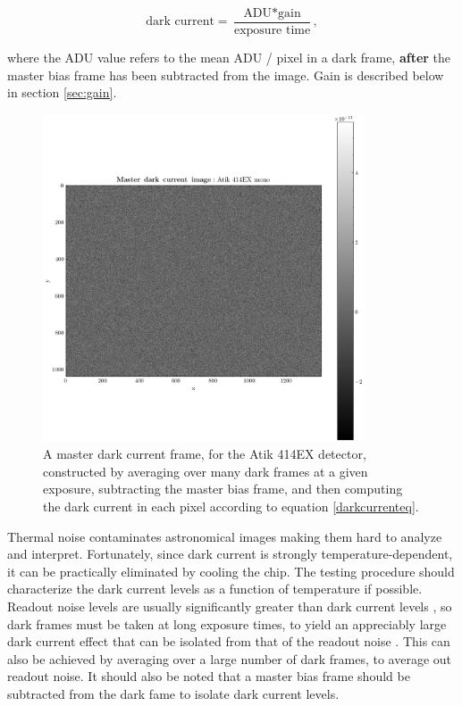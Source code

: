 \documentclass[../main.tex]{subfiles}
\begin{document}
	\begin{equation}\label{darkcurrenteq}
		\text{dark current} = \frac{\text{ADU} * \text{gain}}{\text{exposure time}},
	\end{equation}
	
	where the ADU value refers to the mean ADU / pixel in a dark frame, \textbf{after} the master bias frame has been subtracted from the image. Gain is described below in section \ref{sec:gain}.  
	\begin{figure}[h!]
		\centering
		\includegraphics[width	=0.85\textwidth]{master_dark.png}
		\caption{A master dark current frame, for the Atik 414EX detector, constructed by averaging over many dark frames at a given exposure, subtracting the master bias frame, and then computing the dark current in each pixel according to equation \ref{darkcurrenteq}.}
		\label{fig:masterdarkcurrent}
	\end{figure}
	
	Thermal noise contaminates astronomical images making them hard to analyze and interpret. Fortunately, since dark current is strongly temperature-dependent, it can be practically eliminated by cooling the chip. The testing procedure should characterize the dark current levels as a function of temperature if possible. Readout noise levels are usually significantly greater than dark current levels \cite{handbookofccdastronomy}, so dark frames must be taken at long exposure times, to yield an appreciably large dark current effect that can be isolated from that of the readout noise \cite{handbookofccdastronomy}. This can also be achieved by averaging over a large number of dark frames, to average out readout noise. It should also be noted that a master bias frame should be subtracted from the dark fame to isolate dark current levels. 
\end{document}
